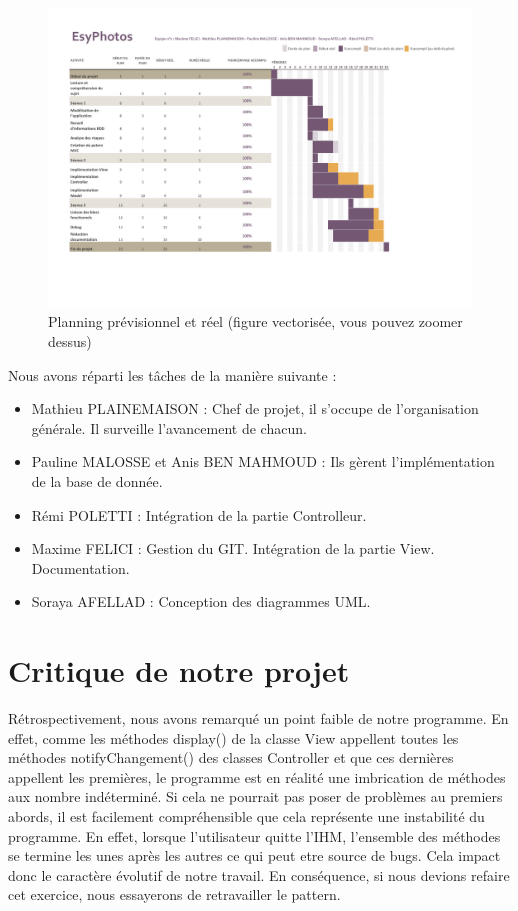 \documentclass{article}
\begin{document}
\begin{flushleft}
\begin{figure}[!h]
  \begin{center}
    \includegraphics[scale=0.5]{fig4} %
    \caption{Planning prévisionnel et réel (figure vectorisée, vous pouvez zoomer dessus)}
  \end{center}
\end{figure}

Nous avons réparti les tâches de la manière suivante : \\

\begin{itemize}
  \item Mathieu PLAINEMAISON : Chef de projet, il s'occupe de l'organisation
  générale. Il surveille l'avancement de chacun.
  \item Pauline MALOSSE et Anis BEN MAHMOUD : Ils gèrent l'implémentation
  de la base de donnée.
  \item Rémi POLETTI : Intégration de la partie Controlleur.
  \item Maxime FELICI : Gestion du GIT. Intégration de la partie View.
  Documentation.
  \item Soraya AFELLAD : Conception des diagrammes UML.
\end{itemize}

\newpage
\section{Critique de notre projet}
Rétrospectivement, nous avons remarqué un point faible de notre programme.
En effet, comme les méthodes display() de la classe View appellent toutes
les méthodes notifyChangement() des classes Controller et que ces dernières
appellent les premières, le programme est en réalité une imbrication de
méthodes aux nombre indéterminé. Si cela ne pourrait pas poser de problèmes
au premiers abords, il est facilement compréhensible que cela représente une
instabilité du programme. En effet, lorsque l’utilisateur quitte l’IHM,
l’ensemble des méthodes se termine les unes après les autres ce qui peut
etre source de bugs. Cela impact donc le caractère évolutif de notre travail.
En conséquence, si nous devions refaire cet exercice, nous essayerons de
retravailler le pattern.




\end{flushleft}
\end{document}
